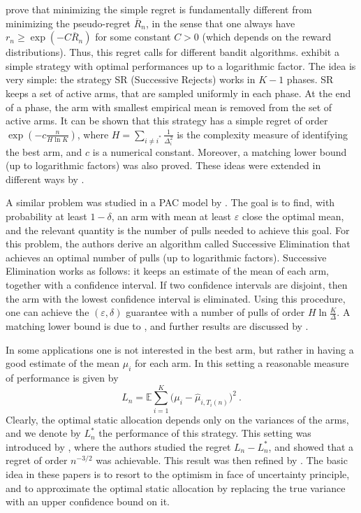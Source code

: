 \documentclass[11pt]{hackednow}
\newcommand{\E}{\mathbb{E}}
\newcommand{\oR}{\overline{R}}
\renewcommand{\epsilon}{\varepsilon}
\begin{document}
\cite{BMS09} prove that minimizing the simple regret is fundamentally different from minimizing the pseudo-regret $\oR_n$, in the sense that one always have $r_n \geq \exp(- C \oR_n)$ for some constant $C>0$ (which depends on the reward distributions). Thus, this regret calls for different bandit algorithms. \cite{ABM10} exhibit a simple strategy with optimal performances up to a logarithmic factor. The idea is very simple: the strategy SR (Successive Rejects) works in $K-1$ phases. SR keeps a set of active arms, that are sampled uniformly in each phase. At the end of a phase, the arm with smallest empirical mean is removed from the set of active arms. It can be shown that this strategy has a simple regret of order $\exp\left(- c \frac{n}{H \ln K}\right)$, where $H = \sum_{i \neq i^*} \frac{1}{\Delta_i^2}$ is the complexity measure of identifying the best arm, and $c$ is a numerical constant. Moreover, a matching lower bound (up to logarithmic factors) was also proved. These ideas were extended in different ways by \cite{GGLB11, BJM11, BWV12}.

A similar problem was studied in a PAC model by \cite{EMM02}. The goal is to find, with probability at least $1-\delta$, an arm with mean at least $\epsilon$ close the optimal mean, and the relevant quantity is the number of pulls needed to achieve this goal. For this problem, the authors derive an algorithm called Successive Elimination that achieves an optimal number of pulls (up to logarithmic factors). Successive Elimination works as follows: it keeps an estimate of the mean of each arm, together with a confidence interval. If two confidence intervals are disjoint, then the arm with the lowest confidence interval is eliminated. Using this procedure, one can achieve the $(\epsilon, \delta)$ guarantee with a number of pulls of order $H \ln \tfrac{K}{\Delta}$. A matching lower bound is due to \cite{MT04}, and further results are discussed by \cite{EMM06}.

In some applications one is not interested in the best arm, but rather in having a good estimate of the mean $\mu_i$ for each arm. In this setting a reasonable measure of performance is given by
$$L_n = \E \sum_{i=1}^K \bigl(\mu_i - \hat{\mu}_{i,T_i(n)}\bigr)^2~.$$
Clearly, the optimal static allocation depends only on the variances of the arms, and we denote by $L_n^*$ the performance of this strategy. 
This setting was introduced by \cite{AGS08}, where the authors studied the regret $L_n - L_n^*$, and showed that a regret of order $n^{-3/2}$ was achievable. This result was then refined by \cite{CLGMA11, CM11}. The basic idea in these papers is to resort to the optimism in face of uncertainty principle, and to approximate the optimal static allocation by replacing the true variance with an upper confidence bound on it.
\end{document}
